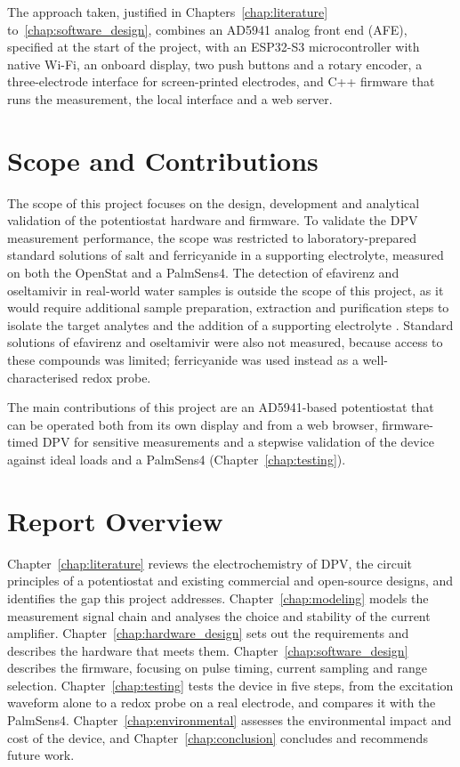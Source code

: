 The approach taken, justified in Chapters~\ref{chap:literature} to~\ref{chap:software_design}, combines an AD5941 analog front end (AFE), specified at the start of the project, with an ESP32-S3 microcontroller with native Wi-Fi, an onboard display, two push buttons and a rotary encoder, a three-electrode interface for screen-printed electrodes, and C++ firmware that runs the measurement, the local interface and a web server.

\section{Scope and Contributions}
\label{sec:scope_exclusions}

The scope of this project focuses on the design, development and analytical validation of the potentiostat hardware and firmware. To validate the DPV measurement performance, the scope was restricted to laboratory-prepared standard solutions of salt and ferricyanide in a supporting electrolyte, measured on both the OpenStat and a PalmSens4. The detection of efavirenz and oseltamivir in real-world water samples is outside the scope of this project, as it would require additional sample preparation, extraction and purification steps to isolate the target analytes and the addition of a supporting electrolyte \cite{Temgoua2023}. Standard solutions of efavirenz and oseltamivir were also not measured, because access to these compounds was limited; ferricyanide was used instead as a well-characterised redox probe.

The main contributions of this project are an AD5941-based potentiostat that can be operated both from its own display and from a web browser, firmware-timed DPV for sensitive measurements and a stepwise validation of the device against ideal loads and a PalmSens4 (Chapter~\ref{chap:testing}).

\section{Report Overview}
\label{sec:intro_overview}

Chapter~\ref{chap:literature} reviews the electrochemistry of DPV, the circuit principles of a
potentiostat and existing commercial and open-source designs, and identifies
the gap this project addresses. Chapter~\ref{chap:modeling} models the measurement signal chain
and analyses the choice and stability of the current amplifier.
Chapter~\ref{chap:hardware_design} sets out the requirements and describes the hardware that meets
them. Chapter~\ref{chap:software_design} describes the firmware, focusing on pulse timing, current
sampling and range selection. Chapter~\ref{chap:testing} tests the device in five steps, from
the excitation waveform alone to a redox probe on a real electrode, and
compares it with the PalmSens4. Chapter~\ref{chap:environmental} assesses the environmental impact
and cost of the device, and Chapter~\ref{chap:conclusion} concludes and recommends future work.